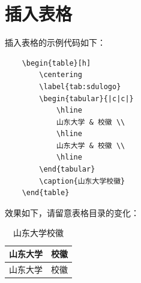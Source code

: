 \documentclass{settings/sdu-thesis}
\begin{document}
\section{插入表格}
插入表格的示例代码如下：
\begin{verbatim}
    \begin{table}[h]
        \centering
        \label{tab:sdulogo}
        \begin{tabular}{|c|c|}
            \hline
            山东大学 & 校徽 \\
            \hline
            山东大学 & 校徽 \\
            \hline
        \end{tabular}
        \caption{山东大学校徽}
    \end{table}
\end{verbatim}
效果如下，请留意表格目录的变化：
\begin{table}[h]
    \centering
    \label{tab:sdulogo}
    \begin{tabular}{|c|c|}
        \hline
        山东大学 & 校徽 \\
        \hline
        山东大学 & 校徽 \\
        \hline
    \end{tabular}
    \caption{山东大学校徽}
\end{table}
\end{document}
